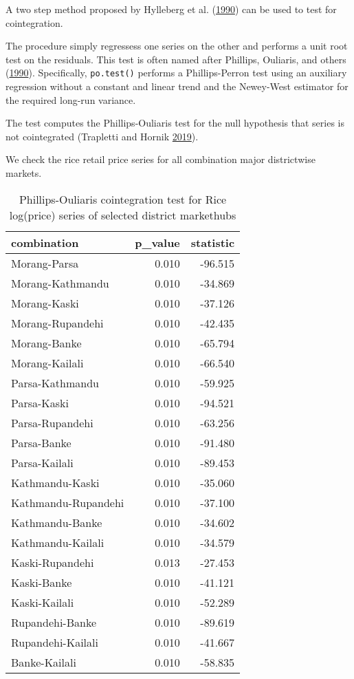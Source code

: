 \documentclass[
  12pt,
]{article}
\begin{document}
A two step method proposed by Hylleberg et al. (\protect\hyperlink{ref-hylleberg1990seasonal}{1990}) can be used to test for cointegration.

The procedure simply regressess one series on the other and performs a unit root test on the residuals. This test is often named after Phillips, Ouliaris, and others (\protect\hyperlink{ref-phillips1990asymptotic}{1990}). Specifically, \texttt{po.test()} performs a Phillips-Perron test using an auxiliary regression without a constant and linear trend and the Newey-West estimator for the required long-run variance.

The test computes the Phillips-Ouliaris test for the null hypothesis that series is not cointegrated (Trapletti and Hornik \protect\hyperlink{ref-R-tseries}{2019}).

We check the rice retail price series for all combination major districtwise markets.

\begin{longtable}[t]{lrr}
\caption{\label{tab:pairwise-phillips-cointegration}Phillips-Ouliaris cointegration test for Rice log(price) series of selected district markethubs}\\
\toprule
combination & p\_value & statistic\\
\midrule
Morang-Parsa & 0.010 & -96.515\\
Morang-Kathmandu & 0.010 & -34.869\\
Morang-Kaski & 0.010 & -37.126\\
Morang-Rupandehi & 0.010 & -42.435\\
Morang-Banke & 0.010 & -65.794\\
\addlinespace
Morang-Kailali & 0.010 & -66.540\\
Parsa-Kathmandu & 0.010 & -59.925\\
Parsa-Kaski & 0.010 & -94.521\\
Parsa-Rupandehi & 0.010 & -63.256\\
Parsa-Banke & 0.010 & -91.480\\
\addlinespace
Parsa-Kailali & 0.010 & -89.453\\
Kathmandu-Kaski & 0.010 & -35.060\\
Kathmandu-Rupandehi & 0.010 & -37.100\\
Kathmandu-Banke & 0.010 & -34.602\\
Kathmandu-Kailali & 0.010 & -34.579\\
\addlinespace
Kaski-Rupandehi & 0.013 & -27.453\\
Kaski-Banke & 0.010 & -41.121\\
Kaski-Kailali & 0.010 & -52.289\\
Rupandehi-Banke & 0.010 & -89.619\\
Rupandehi-Kailali & 0.010 & -41.667\\
\addlinespace
Banke-Kailali & 0.010 & -58.835\\
\bottomrule
\end{longtable}
\end{document}
